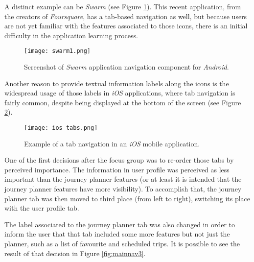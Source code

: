 A distinct example can be \emph{Swarm} (see Figure \ref{fig:swarm1}). This recent application, from the creators of \emph{Foursquare}, has a tab-based navigation as well, but because users are not yet familiar with the features associated to those icons, there is an initial difficulty in the application learning process.

\clearpage

\begin{figure}[htb]
  \begin{center}
    \leavevmode
    \texttt{[image: swarm1.png]}
    \caption{Screenshot of \emph{Swarm} application navigation component for \emph{Android}.}
    \label{fig:swarm1}
  \end{center}
\end{figure}



Another reason to provide textual information labels along the icons is the widespread usage of those labels in \emph{iOS} applications, where tab navigation is fairly common, despite being displayed at the bottom of the screen (see Figure \ref{fig:ios-tabs}).

\begin{figure}[h!]
  \begin{center}
    \leavevmode
    \texttt{[image: ios\_tabs.png]}
    \caption{Example of a tab navigation in an \emph{iOS} mobile application.}
    \label{fig:ios-tabs}
  \end{center}
\end{figure}



One of the first decisions after the focus group was to re-order those tabs by perceived importance. The information in user profile was perceived as less important than the journey planner features (or at least it is intended that the journey planner features have more visibility). To accomplish that, the journey planner tab was then moved to third place (from left to right), switching its place with the user profile tab.

The label associated to the journey planner tab was also changed in order to inform the user that that tab included some more features but not just the planner, such as a list of favourite and scheduled trips.
It is possible to see the result of that decision in Figure \ref{fig:mainnav3}.


